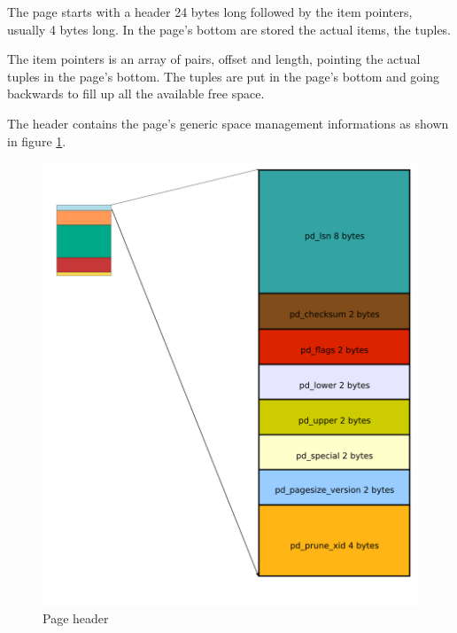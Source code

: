 The page starts with a header 24 bytes long followed 
by 
the item pointers, usually 4 bytes long. In the page's bottom are stored the 
actual items, the tuples.\newline

The item pointers is an array of pairs, offset and 
length, pointing the actual tuples in the page's bottom. The tuples are put in 
the page's bottom and going backwards to fill up all the available free 
space.\newline 

The header contains the page's generic space management informations as shown 
in figure \ref{fig:HEADERPAG01}. 


\begin{figure}[H]
\begin{center}

\includegraphics[scale=0.55]{images/header_page_01.png}

\caption{Page header}
\label{fig:HEADERPAG01} 
\end{center}

\end{figure}
